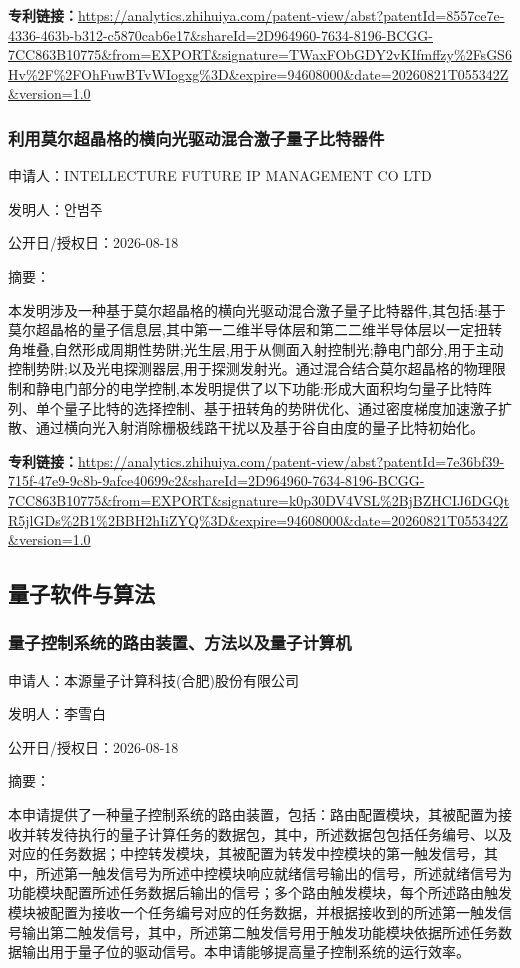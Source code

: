 \documentclass[12pt,a4paper]{ctexart}
\begin{document}
\noindent\textbf{专利链接：}\url{https://analytics.zhihuiya.com/patent-view/abst?patentId=8557ce7e-4336-463b-b312-c5870cab6e17&shareId=2D964960-7634-8196-BCGG-7CC863B10775&from=EXPORT&signature=TWaxFObGDY2vKIfmffzy%2FsGS6Hv%2F%2FOhFuwBTvWIogxg%3D&expire=94608000&date=20260821T055342Z&version=1.0}

\subsubsection{ 利用莫尔超晶格的横向光驱动混合激子量子比特器件 }

申请人：INTELLECTURE FUTURE IP MANAGEMENT CO LTD

发明人：안범주

公开日/授权日：2026-08-18

摘要：

本发明涉及一种基于莫尔超晶格的横向光驱动混合激子量子比特器件,其包括:基于莫尔超晶格的量子信息层,其中第一二维半导体层和第二二维半导体层以一定扭转角堆叠,自然形成周期性势阱;光生层,用于从侧面入射控制光;静电门部分,用于主动控制势阱;以及光电探测器层,用于探测发射光。通过混合结合莫尔超晶格的物理限制和静电门部分的电学控制,本发明提供了以下功能:形成大面积均匀量子比特阵列、单个量子比特的选择控制、基于扭转角的势阱优化、通过密度梯度加速激子扩散、通过横向光入射消除栅极线路干扰以及基于谷自由度的量子比特初始化。

\noindent\textbf{专利链接：}\url{https://analytics.zhihuiya.com/patent-view/abst?patentId=7e36bf39-715f-47e9-9c8b-9afce40699c2&shareId=2D964960-7634-8196-BCGG-7CC863B10775&from=EXPORT&signature=k0p30DV4VSL%2BjBZHCIJ6DGQtR5jlGDs%2B1%2BBH2hIiZYQ%3D&expire=94608000&date=20260821T055342Z&version=1.0}


\subsection{ 量子软件与算法 }

\subsubsection{ 量子控制系统的路由装置、方法以及量子计算机 }

申请人：本源量子计算科技(合肥)股份有限公司

发明人：李雪白

公开日/授权日：2026-08-18

摘要：

本申请提供了一种量子控制系统的路由装置，包括：路由配置模块，其被配置为接收并转发待执行的量子计算任务的数据包，其中，所述数据包包括任务编号、以及对应的任务数据；中控转发模块，其被配置为转发中控模块的第一触发信号，其中，所述第一触发信号为所述中控模块响应就绪信号输出的信号，所述就绪信号为功能模块配置所述任务数据后输出的信号；多个路由触发模块，每个所述路由触发模块被配置为接收一个任务编号对应的任务数据，并根据接收到的所述第一触发信号输出第二触发信号，其中，所述第二触发信号用于触发功能模块依据所述任务数据输出用于量子位的驱动信号。本申请能够提高量子控制系统的运行效率。
\end{document}
